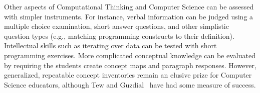 Other aspects of Computational Thinking and Computer Science can be assessed with simpler instruments.
For instance, verbal information can be judged using a multiple choice examination, short answer questions, and other simplistic question types (e.g., matching programming constructs to their definition).
Intellectual skills such as iterating over data can be tested with short programming exercises.
More complicated conceptual knowledge can be evaluated by requiring the students create concept maps and paragraph responses.
However, generalized, repeatable concept inventories remain an elusive prize for Computer Science educators, although Tew and Guzdial~\cite{Tew:2011:FLI:1953163.1953200} have had some measure of success.

